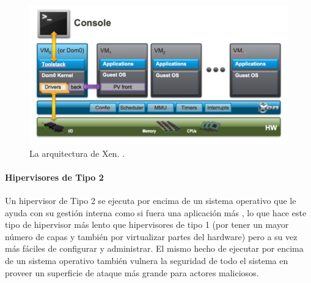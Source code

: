 \begin{figure}
  \begin{center}
      \includegraphics[width=\textwidth]{Figures/arq-xen.png}
  \end{center}
  \caption{La arquitectura de Xen.   \citep{Xen-Project-Overview}.}
  \label{arq-xen}
\end{figure}

 
\paragraph{Hipervisores de Tipo 2}
Un hipervisor de Tipo 2 se ejecuta por encima de un sistema operativo que le ayuda con su gestión interna como si fuera una aplicación más \citep{IBM-Hypervisors}, lo que hace este tipo de hipervisor más lento que hipervisores de tipo 1 (por tener un mayor número de capas y también por virtualizar partes del hardware) pero a su vez más fáciles de configurar y administrar. El mismo hecho de ejecutar por encima de un sistema operativo también vulnera la seguridad de todo el sistema en proveer un superficie de ataque más grande para actores maliciosos.

